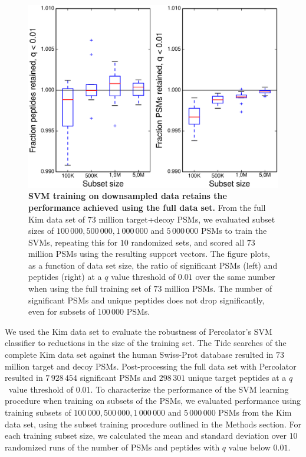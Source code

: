 \documentclass{article}
\begin{document}
\begin{figure}
\begin{center}
\includegraphics[width=0.6\linewidth]{./img/subset-performance}
\caption{\label{fig:subset}\textbf{SVM training on downsampled data
    retains the performance achieved using the full data set.}  From
  the full Kim data set of $73$ million target+decoy PSMs, we
  evaluated subset sizes of $100\,000, 500\,000, 1\,000\,000$ and
  $5\,000\,000$ PSMs to train the SVMs, repeating this for $10$
  randomized sets, and scored all $73$ million PSMs using the
  resulting support vectors. The figure plots, as a function of data
  set size, the ratio of significant PSMs (left) and peptides (right)
  at a $q$ value threshold of $0.01$ over the same number when using
  the full training set of $73$ million PSMs. The number of 
  significant PSMs and unique peptides does not drop significantly, 
  even for subsets of $100\,000$ PSMs.}
\end{center}
\end{figure}

We used the Kim data set to evaluate the robustness of Percolator's 
SVM classifier to reductions in the size of the training set.  The 
Tide searches of the complete Kim data set against the human 
Swiss-Prot database resulted in $73$ million target and decoy PSMs. 
Post-processing the full data set with Percolator resulted in 
$7\,928\,454$ significant PSMs and $298\,301$ unique target peptides 
at a $q$~value threshold of $0.01$.  To characterize the performance 
of the SVM learning procedure when training on subsets of the PSMs, we 
evaluated performance using training subsets of $100\,000, 500\,000, 
1\,000\,000$ and $5\,000\,000$ PSMs from the Kim data set, using the 
subset training procedure outlined in the Methods section. For each 
training subset size, we calculated the mean and standard deviation 
over $10$ randomized runs of the number of PSMs and peptides with $q$ 
value below $0.01$.
\end{document}
